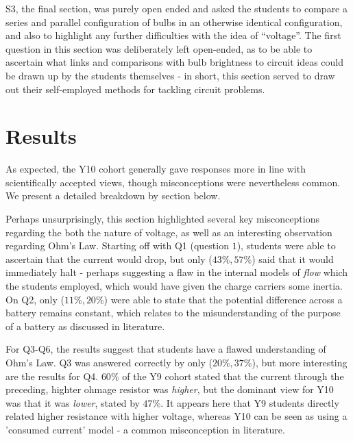 \documentclass[a4paper,openany,nobib]{tufte-book}
\begin{document}
S3, the final section, was purely open ended and asked the students to compare a series and parallel configuration of bulbs in an otherwise identical configuration, and also to highlight any further difficulties with the idea of ``voltage''.
The first question in this section was deliberately left open-ended, as to be able to ascertain what links and comparisons with bulb brightness to circuit ideas could be drawn up by the students themselves - in short, this section served to draw out their self-employed methods for tackling circuit problems.
\chapter{Results}
As expected, the Y10 cohort generally gave responses more in line with scientifically accepted views, though misconceptions were nevertheless common. We present a detailed breakdown by section below.

Perhaps unsurprisingly, this section highlighted several key misconceptions regarding the both the nature of voltage, as well as an interesting observation regarding Ohm's Law. 
Starting off with Q1 (question $1$), students were able to ascertain that the current would drop,
but only ($43\%,57\%$) said that it would immediately halt - perhaps suggesting a flaw in the internal models of \emph{flow} which the students employed, which would have given the charge carriers some inertia. 
On Q2, only ($11\%, 20\%$) were able to state that the potential difference across a battery remains constant, which relates to the misunderstanding of the purpose of a battery as discussed in literature\autocite{shipstone_children}. 

For Q3-Q6, the results suggest that students have a flawed understanding of Ohm's Law. Q3 was answered correctly by only ($20\%,37\%$), but more interesting are the results for Q4. $60\%$ of the Y9 cohort stated that the current through the preceding, highter ohmage resistor was \emph{higher}, but the dominant view for Y10 was that it was \emph{lower}, stated by $47\%$. It appears here that Y9 students directly related higher resistance with higher voltage, whereas Y10 can be seen as using a 'consumed current' model - a common misconception in literature.
\end{document}
